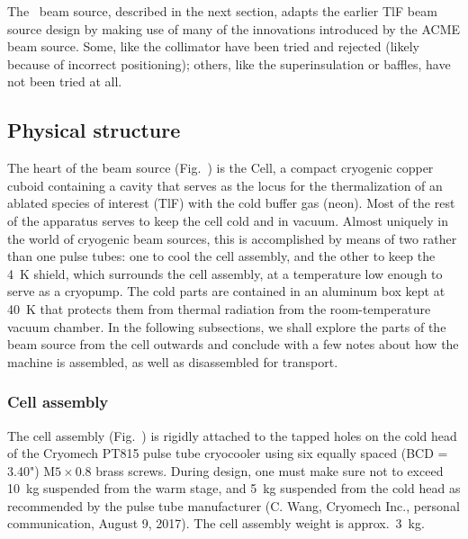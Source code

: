 The \CENTREX\ beam source, described in the next section, adapts the earlier TlF
beam source design by making use of many of the innovations introduced by the
ACME beam source. Some, like the collimator have been tried and rejected (likely
because of incorrect positioning); others, like the superinsulation or baffles,
have not been tried at all.

\subsection{Physical structure}

The heart of the beam source (Fig.~) is the Cell, a compact
cryogenic copper cuboid containing a cavity that serves as the locus for the
thermalization of an ablated species of interest (TlF) with the cold buffer gas
(neon). Most of the rest of the apparatus serves to keep the cell cold and in
vacuum. Almost uniquely in the world of cryogenic beam sources, this is
accomplished by means of two rather than one pulse tubes: one to cool the cell
assembly, and the other to keep the 4~K shield, which surrounds the cell
assembly, at a temperature low enough to serve as a cryopump. The cold parts are
contained in an aluminum box kept at 40~K that protects them from thermal
radiation from the room-temperature vacuum chamber. In the following
subsections, we shall explore the parts of the beam source from the cell
outwards and conclude with a few notes about how the machine is assembled, as
well as disassembled for transport.

\subsubsection{Cell assembly}
\label{cell_ass_sect}

The cell assembly (Fig.~) is rigidly attached to the tapped
holes on the cold head of the Cryomech PT815 pulse tube cryocooler using six
equally spaced (BCD = 3.40") M$5\times0.8$ brass screws. During design, one must
make sure not to exceed 10~kg suspended from the warm stage, and 5~kg suspended
from the cold head as recommended by the pulse tube manufacturer (C. Wang,
Cryomech Inc., personal communication, August 9, 2017). The cell assembly weight
is approx.\ 3~kg.

